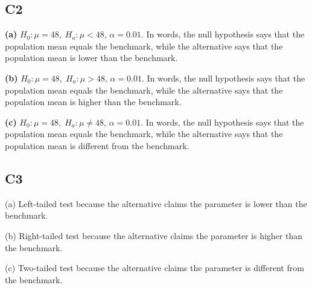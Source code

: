 		\subsection*{C2}
		\textbf{(a)} \(H_0\colon \mu=48,\; H_a\colon \mu<48\), \(\alpha=0.01\). In words, the null hypothesis says that the population mean equals the benchmark, while the alternative says that the population mean is lower than the benchmark.
		
		\textbf{(b)} \(H_0\colon \mu=48,\; H_a\colon \mu>48\), \(\alpha=0.01\). In words, the null hypothesis says that the population mean equals the benchmark, while the alternative says that the population mean is higher than the benchmark.
		
		\textbf{(c)} \(H_0\colon \mu=48,\; H_a\colon \mu\ne 48\), \(\alpha=0.01\). In words, the null hypothesis says that the population mean equals the benchmark, while the alternative says that the population mean is different from the benchmark.
		
		\subsection*{C3}
		(a) Left-tailed test because the alternative claims the parameter is lower than the benchmark.\LeftTailGraph
		
		(b) Right-tailed test because the alternative claims the parameter is higher than the benchmark.\RightTailGraph
		
		(c) Two-tailed test because the alternative claims the parameter is different from the benchmark.\TwoTailGraph
		


